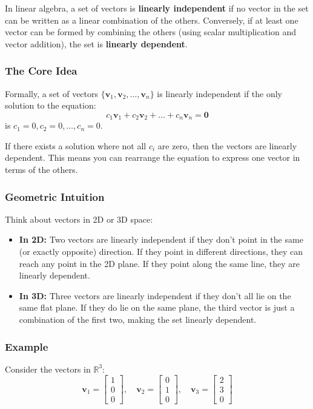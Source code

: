 

In linear algebra, a set of vectors is \textbf{linearly independent} if no vector in the set can be written as a linear combination of the others. Conversely, if at least one vector can be formed by combining the others (using scalar multiplication and vector addition), the set is \textbf{linearly dependent}.

\subsubsection*{The Core Idea}

Formally, a set of vectors $\{\mathbf{v}_1, \mathbf{v}_2, \dots, \mathbf{v}_n\}$ is linearly independent if the only solution to the equation:
\[ c_1\mathbf{v}_1 + c_2\mathbf{v}_2 + \dots + c_n\mathbf{v}_n = \mathbf{0} \]
is $c_1 = 0, c_2 = 0, \dots, c_n = 0$.

If there exists a solution where not all $c_i$ are zero, then the vectors are linearly dependent. This means you can rearrange the equation to express one vector in terms of the others.

\subsubsection*{Geometric Intuition}

Think about vectors in 2D or 3D space:
\begin{itemize}[leftmargin=*]
    \item \textbf{In 2D:} Two vectors are linearly independent if they don't point in the same (or exactly opposite) direction. If they point in different directions, they can reach any point in the 2D plane. If they point along the same line, they are linearly dependent.
    \item \textbf{In 3D:} Three vectors are linearly independent if they don't all lie on the same flat plane. If they do lie on the same plane, the third vector is just a combination of the first two, making the set linearly dependent.
\end{itemize}

\subsubsection*{Example}

Consider the vectors in $\mathbb{R}^3$:
\[ \mathbf{v}_1 = \begin{bmatrix} 1 \\ 0 \\ 0 \end{bmatrix}, \quad \mathbf{v}_2 = \begin{bmatrix} 0 \\ 1 \\ 0 \end{bmatrix}, \quad \mathbf{v}_3 = \begin{bmatrix} 2 \\ 3 \\ 0 \end{bmatrix} \]

